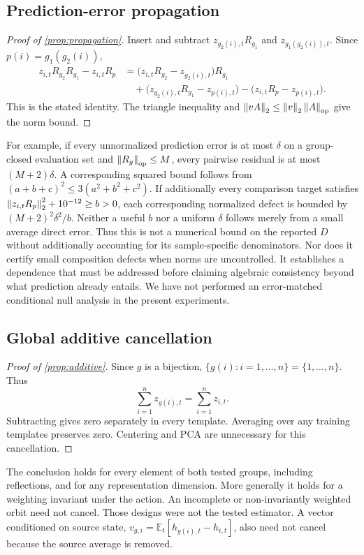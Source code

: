 \subsection{Prediction-error propagation}
\begin{proof}[Proof of \cref{prop:propagation}]
Insert and subtract $z_{g_2(i),t}R_{g_1}$ and $z_{g_1(g_2(i)),t}$. Since $p(i)=g_1(g_2(i))$,
\begin{align*}
 z_{i,t}R_{g_2}R_{g_1}-z_{i,t}R_p
 &=\bigl(z_{i,t}R_{g_2}-z_{g_2(i),t}\bigr)R_{g_1}\\
 &\quad+\bigl(z_{g_2(i),t}R_{g_1}-z_{p(i),t}\bigr)
       -\bigl(z_{i,t}R_p-z_{p(i),t}\bigr).
\end{align*}
This is the stated identity. The triangle inequality and $\left\lVert vA\right\rVert_2\leq\left\lVert v\right\rVert_2\left\lVert A\right\rVert_{\rm op}$ give the norm bound.
\end{proof}
For example, if every unnormalized prediction error is at most $\delta$ on a group-closed evaluation set and $\left\lVert R_g\right\rVert_{\rm op}\leq M$, every pairwise residual is at most $(M+2)\delta$. A corresponding squared bound follows from $(a+b+c)^2\leq3(a^2+b^2+c^2)$. If additionally every comparison target satisfies $\left\lVert z_{i,t}R_p\right\rVert_2^2+10^{-12}\geq b>0$, each corresponding normalized defect is bounded by $(M+2)^2\delta^2/b$. Neither a useful $b$ nor a uniform $\delta$ follows merely from a small average direct error. Thus this is not a numerical bound on the reported $D$ without additionally accounting for its sample-specific denominators. Nor does it certify small composition defects when norms are uncontrolled. It establishes a dependence that must be addressed before claiming algebraic consistency beyond what prediction already entails. We have not performed an error-matched conditional null analysis in the present experiments.

\subsection{Global additive cancellation}
\begin{proof}[Proof of \cref{prop:additive}]
Since $g$ is a bijection, $\{g(i):i=1,\ldots,n\}=\{1,\ldots,n\}$. Thus
\[
 \sum_{i=1}^n z_{g(i),t}=\sum_{i=1}^n z_{i,t}.
\]
Subtracting gives zero separately in every template. Averaging over any training templates preserves zero. Centering and PCA are unnecessary for this cancellation.
\end{proof}
The conclusion holds for every element of both tested groups, including reflections, and for any representation dimension. More generally it holds for a weighting invariant under the action. An incomplete or non-invariantly weighted orbit need not cancel. Those designs were not the tested estimator. A vector conditioned on source state, $v_{g,i}=\mathbb{E}_t[h_{g(i),t}-h_{i,t}]$, also need not cancel because the source average is removed.

